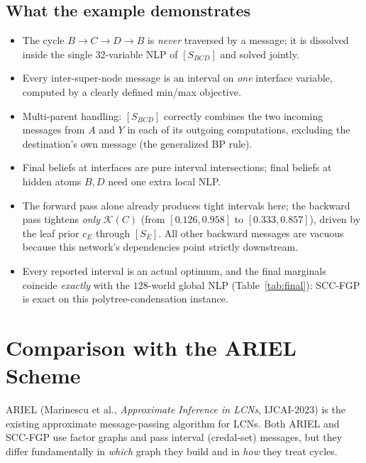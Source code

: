 \documentclass[11pt]{article}
\newcommand{\cK}{\mathcal{K}}
\begin{document}
\subsection{What the example demonstrates}
\begin{itemize}
  \item The cycle $B\!\to\!C\!\to\!D\!\to\!B$ is \emph{never} traversed by a
        message; it is dissolved inside the single $32$-variable NLP of
        $[S_{BCD}]$ and solved jointly.
  \item Every inter-super-node message is an interval on \emph{one} interface
        variable, computed by a clearly defined min/max objective.
  \item Multi-parent handling: $[S_{BCD}]$ correctly combines the two incoming
        messages from $A$ and $Y$ in each of its outgoing computations,
        excluding the destination's own message (the generalized BP rule).
  \item Final beliefs at interfaces are pure interval intersections; final
        beliefs at hidden atoms $B,D$ need one extra local NLP.
  \item The forward pass alone already produces tight intervals here; the
        backward pass tightens \emph{only} $\cK(C)$ (from $[0.126,0.958]$ to
        $[0.333,0.857]$), driven by the leaf prior $c_E$ through $[S_E]$. All
        other backward messages are vacuous because this network's
        dependencies point strictly downstream.
  \item Every reported interval is an actual optimum, and the final marginals
        coincide \emph{exactly} with the $128$-world global NLP
        (Table~\ref{tab:final}): SCC-FGP is exact on this polytree-condensation
        instance.
\end{itemize}

\section{Comparison with the ARIEL Scheme}\label{sec:ariel}

ARIEL (Marinescu et al., \emph{Approximate Inference in LCNs}, IJCAI-2023) is
the existing approximate message-passing algorithm for LCNs. Both ARIEL and
SCC-FGP use factor graphs and pass interval (credal-set) messages, but they
differ fundamentally in \emph{which} graph they build and in \emph{how} they
treat cycles.
\end{document}
